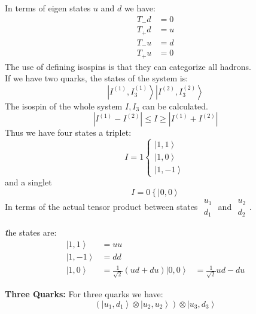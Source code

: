 \documentclass[10pt,a4paper]{article}
\newenvironment{callout}
	{\begin{calloutbox}\color{charcoal}\textbf\textit}
	{\end{calloutbox}}
\newcommand{\ket}[1]{\left\vert #1 \right\rangle}
\begin{document}
     In terms of eigen states $u$ and $d$ we have:
     \begin{align}
          T_- d &= 0 \\ 
          T_+ d &= u\\
          T_- u &= d \\
          T_+ u &= 0
     \end{align}
     The use of defining isospins is that they can categorize all hadrons.
     \\
     If we have two quarks, the states of the system is:
     \begin{equation}
          \ket{I^{(1)}, I_3^{(1)}}\ket{I^{(2)}, I_3^{(2)}}
     \end{equation}
     The isospin of the whole system $I, I_3$ can be calculated.
     \begin{equation} 
          |I^{(1)} - I^{(2)}| \leq I \geq |I^{(1)} + I^{(2)}|
     \end{equation}
     Thus we have four states a triplet:
     \begin{equation}
          I = 1 \left\{\begin{matrix}\ket{1,1}\\ \ket{1,0} \\ \ket{1,-1}\end{matrix} \right.
     \end{equation}
     and a singlet
     \begin{equation}
          I = 0 \left\{\ket{0,0}\right.
     \end{equation}
     In terms of the actual tensor product between states $\begin{matrix} u_1 \\ d_1 \end{matrix}$ and $\begin{matrix} u_2 \\ d_2 \end{matrix}$.
     \begin{callout}
          the states are:
          \begin{align}
          \ket{1,1} &=  uu \\
          \ket{1,-1}&= dd\\
          \ket{1,0} &= \frac{1}{\sqrt 2}(ud+du)
          \ket{0,0} &= \frac{1}{\sqrt 2}{ud-du}
          \end{align}

     \end{callout}
     \textbf{Three Quarks:} For three quarks we have:
     \begin{equation}
          (\ket{u_1,d_1} \otimes \ket{u_2,u_2})\otimes \ket{u_3,d_3}
     \end{equation}
\end{document}
